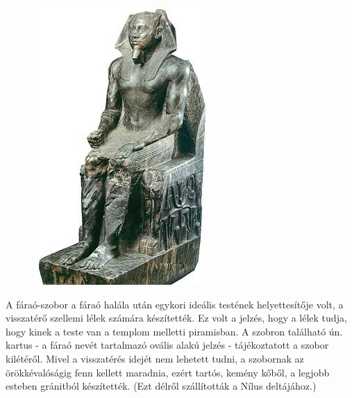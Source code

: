 \begin{figure}
	\begin{tcolorbox}[enhanced,colframe=gray!50!white,
		colbacktitle=white!15!white,
		coltitle=gray!50!black,
		borderline={0.5mm}{0mm}{gray!15!white},
		borderline={0.5mm}{0mm}{gray!50!white,dashed},
		attach boxed title to top center={yshift=-2mm},
		boxed title style={boxrule=0.4pt},
		title=Kefrén fáraó szobra]{
			\includegraphics[width=1.0\linewidth]{images/01/kefren_szobra}}
	\end{tcolorbox}
\end{figure} 

A fáraó-szobor a fáraó halála után egykori ideális testének helyettesítője volt, a visszatérő szellemi lélek számára készítették. Ez volt a jelzés, hogy a lélek tudja, hogy kinek a teste van a templom melletti piramisban. A szobron található ún. kartus - a fáraó nevét tartalmazó ovális alakú jelzés - tájékoztatott a szobor kilétéről. Mivel a visszatérés idejét nem lehetett tudni, a szobornak az örökkévalóságig fenn kellett maradnia, ezért tartós, kemény kőből, a legjobb esteben gránitból készítették. (Ezt délről szállították a Nílus deltájához.)


